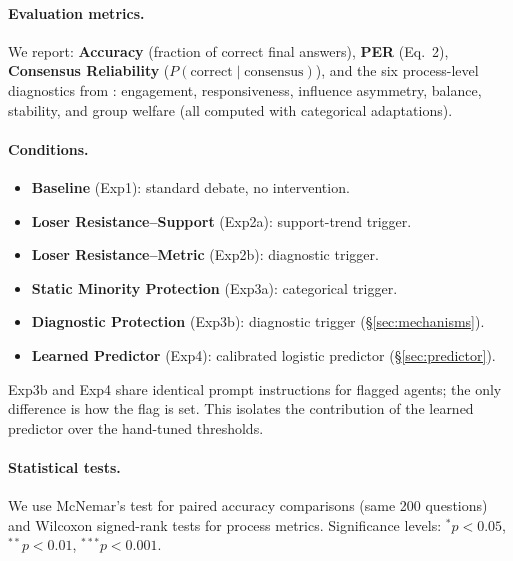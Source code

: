 \paragraph{Evaluation metrics.}
We report:
\textbf{Accuracy} (fraction of correct final answers),
\textbf{PER} (Eq.~2),
\textbf{Consensus Reliability} ($P(\text{correct}\mid\text{consensus})$),
and the six process-level diagnostics from \citeauthor{diagnostic2026}:
engagement, responsiveness, influence asymmetry, balance, stability, and
group welfare (all computed with categorical adaptations).

\paragraph{Conditions.}
\begin{itemize}[noitemsep,topsep=2pt]
  \item \textbf{Baseline} (Exp1): standard debate, no intervention.
  \item \textbf{Loser Resistance--Support} (Exp2a): support-trend trigger.
  \item \textbf{Loser Resistance--Metric} (Exp2b): diagnostic trigger.
  \item \textbf{Static Minority Protection} (Exp3a): categorical trigger.
  \item \textbf{Diagnostic Protection} (Exp3b): diagnostic trigger (\S\ref{sec:mechanisms}).
  \item \textbf{Learned Predictor} (Exp4): calibrated logistic predictor (\S\ref{sec:predictor}).
\end{itemize}
Exp3b and Exp4 share identical prompt instructions for flagged agents; the
only difference is how the flag is set.
This isolates the contribution of the learned predictor over the hand-tuned
thresholds.

\paragraph{Statistical tests.}
We use McNemar's test for paired accuracy comparisons (same 200 questions)
and Wilcoxon signed-rank tests for process metrics.
Significance levels: $^{*}p\!<\!0.05$, $^{**}p\!<\!0.01$,
$^{***}p\!<\!0.001$.
